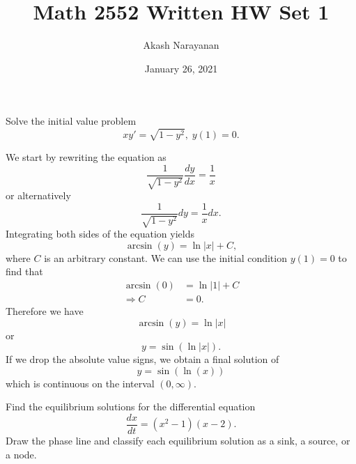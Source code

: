 \documentclass[11pt, titlepage]{article}
\title{Math 2552 Written HW Set 1}
\author{Akash Narayanan}
\date{January 26, 2021}
\begin{document}
  \maketitle

  \begin{problem}[Judson 1.2.17]
    Solve the initial value problem
    \begin{equation*}
      xy' = \sqrt{1-y^{2}}, \; y(1) = 0.
    \end{equation*}
  \end{problem}

  \begin{solution}
    We start by rewriting the equation as
    \begin{equation*}
      \frac{1}{\sqrt{1-y^{2}}} \frac{dy}{dx} = \frac{1}{x}
    \end{equation*}
    or alternatively
    \begin{equation*}
      \frac{1}{\sqrt{1-y^{2}}} dy = \frac{1}{x} dx.
    \end{equation*}
    Integrating both sides of the equation yields
    \begin{equation*}
      \arcsin(y) = \ln|x| + C,
    \end{equation*}
    where \(C\) is an arbitrary constant.
    We can use the initial condition \(y(1) = 0\) to find that
    \begin{align*}
      \arcsin(0) &= \ln|1| + C \\
      \Longrightarrow C &= 0.
    \end{align*}
    Therefore we have
    \begin{equation*}
      \arcsin(y) = \ln|x|
    \end{equation*}
    or
    \begin{equation*}
      y = \sin(\ln|x|).
    \end{equation*}
    If we drop the absolute value signs, we obtain a final solution of
    \begin{equation*}
      y = \sin(\ln(x))
    \end{equation*}
    which is continuous on the interval \((0, \infty)\).
  \end{solution}

  \pagebreak

  \begin{problem}[Judson 1.3.10]
    Find the equilibrium solutions for the differential equation
    \begin{equation*}
      \frac{dx}{dt} = (x^{2} - 1) (x - 2).
    \end{equation*}
    Draw the phase line and classify each equilibrium solution as a sink, a source, or a node.
  \end{problem}
\end{document}
